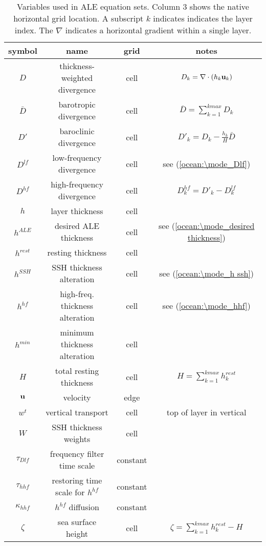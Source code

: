 \begin{table}[h!t] 
\caption{Variables used in ALE equation sets.  Column 3 shows the native horizontal grid location.  A subscript $k$ indicates indicates the layer index.  The $\nabla$ indicates a horizontal gradient within a single layer.} 
\vspace{0.5cm} \centering 
\begin{tabular}{c c c c } 
\hline\hline symbol &  name & grid &  notes  \\
\hline 
$D$  & thickness-weighted divergence & cell & $D_k = \nabla \cdot  \left( h_k {\bf u}_k \right)$  \\ 
${\bar D}$ & barotropic divergence & cell & ${\overline D} = \sum\limits_{k=1}^{kmax} D_k$  \\ 
$D'$  & baroclinic divergence & cell & $D'_k = D_k-\frac{h_k}{H}{\bar D}$  \\ 
$D^{lf}$  & low-frequency divergence & cell & see (\ref{ocean:\mode_Dlf})  \\ 
$D^{hf}$  & high-frequency divergence & cell & $D^{hf}_k = D'_k - D^{lf}_k$  \\ 
$h$  & layer thickness & cell &   \\ 
$h^{ALE}$  & desired ALE thickness & cell & see (\ref{ocean:\mode_desired thickness})  \\ 
$h^{rest}$  & resting thickness & cell &   \\ 
$h^{SSH}$  & SSH thickness alteration & cell & see (\ref{ocean:\mode_h ssh})  \\ 
$h^{hf}$  & high-freq. thickness alteration & cell &   see (\ref{ocean:\mode_hhf})  \\ 
$h^{min}$  & minimum thickness alteration & cell &   \\ 
$H$  & total resting thickness & cell & $H= \sum\limits_{k=1}^{kmax} h_k^{rest}$  \\ 
${\bf u}$  & velocity & edge &   \\ 
$w^t$ & vertical transport & cell  & top of layer in vertical \\
$W$  & SSH thickness weights & cell &   \\ 
$\tau_{Dlf}$  & frequency filter time scale & constant &   \\ 
$\tau_{hhf}$  & restoring time scale for $h^{hf}$ & constant &   \\ 
$\kappa_{hhf}$  & $h^{hf}$ diffusion & constant &   \\ 
$\zeta$  & sea surface height & cell &  $\zeta= \sum\limits_{k=1}^{kmax} h_k^{rest} - H$  \\ 
\hline 
\end{tabular} \label{oceanTable:\mode_ALE_variables} 
\end{table}

